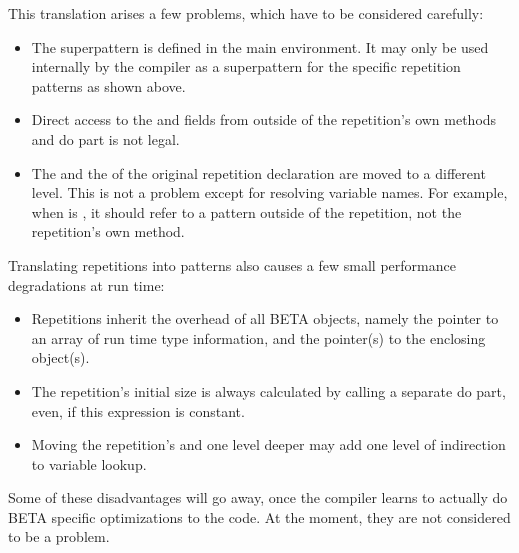 This translation arises a few problems, which have to be considered
carefully:
\begin{itemize}
\item The  superpattern is defined in the main
     environment.  It may only be used internally by
    the compiler as a superpattern for the specific repetition
    patterns as shown above.
\item Direct access to the  and  fields from
    outside of the repetition's own methods and do part is not
    legal.
\item The  and the  of the original
    repetition declaration are moved to a different level.  This
    is not a problem except for resolving variable names.  For
    example, when  is , it should refer to a
     pattern outside of the repetition, not the
    repetition's own  method.
\end{itemize}

Translating repetitions into patterns also causes a few small
performance degradations at run time:
\begin{itemize}
\item Repetitions inherit the overhead of all BETA objects, namely
    the pointer to an array of run time type information, and the
    pointer(s) to the enclosing object(s).
\item The repetition's initial size is always calculated by
    calling a separate do part, even, if this expression is
    constant.
\item Moving the repetition's  and  one
    level deeper may add one level of indirection to variable
    lookup.
\end{itemize}
Some of these disadvantages will go away, once the compiler learns
to actually do BETA specific optimizations to the code.  At the
moment, they are not considered to be a problem.
